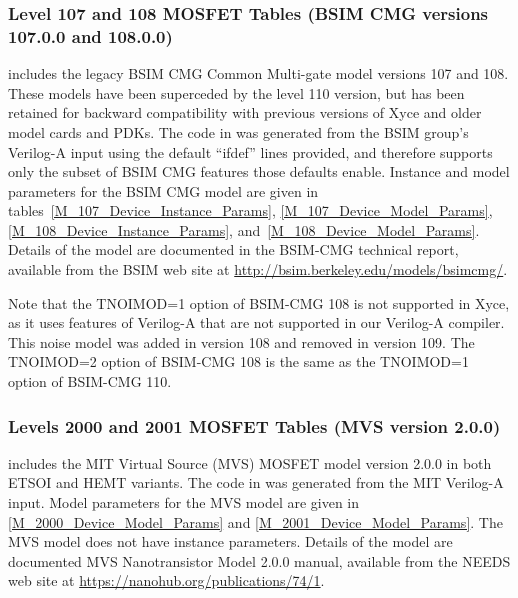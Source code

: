 



\subsubsection{Level 107  and 108 MOSFET Tables (BSIM CMG versions 107.0.0 and 108.0.0)}
\Xyce{} includes the legacy BSIM CMG Common Multi-gate model versions 107 and 108.
These models have been superceded by the level 110 version, but has been
retained for backward compatibility with previous versions of Xyce and
older model cards and PDKs.  The code in \Xyce{} was generated from the BSIM
group's Verilog-A input using the default ``ifdef'' lines provided,
and therefore supports only the subset of BSIM CMG features those
defaults enable.  Instance and model parameters for the BSIM CMG model
are given in tables~\ref{M_107_Device_Instance_Params},
\ref{M_107_Device_Model_Params}, \ref{M_108_Device_Instance_Params},
and~\ref{M_108_Device_Model_Params}.  Details of the model are documented
in the BSIM-CMG technical report\cite{BSIMCMG:Manual}, available from
the BSIM web site at \url{http://bsim.berkeley.edu/models/bsimcmg/}.

Note that the TNOIMOD=1 option of BSIM-CMG 108 is not supported in
Xyce, as it uses features of Verilog-A that are not supported in our
Verilog-A compiler.  This noise model was added in version 108 and
removed in version 109.  The TNOIMOD=2 option of BSIM-CMG 108 is the
same as the TNOIMOD=1 option of BSIM-CMG 110.










\clearpage
\subsubsection{Levels 2000 and 2001 MOSFET Tables (MVS version 2.0.0)}
\Xyce{} includes the MIT Virtual Source (MVS) MOSFET model version
2.0.0 in both ETSOI and HEMT variants.  The code in \Xyce{} was
generated from the MIT Verilog-A input.  Model parameters for the MVS
model are given in \ref{M_2000_Device_Model_Params} and
\ref{M_2001_Device_Model_Params}.  The MVS model does not have
instance parameters.  Details of the model are documented MVS
Nanotransistor Model 2.0.0 manual, available from the NEEDS web site
at \url{https://nanohub.org/publications/74/1}.

